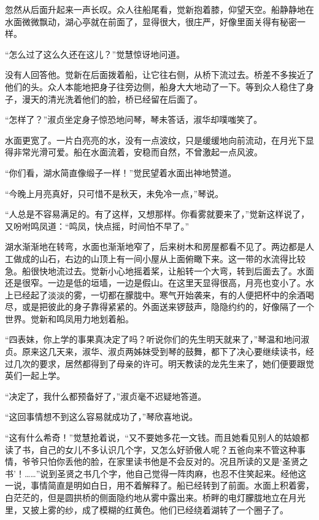 \par 忽然从后面升起来一声长叹。众人往船尾看，觉新抱着膝，仰望天空。船静静地在水面微微飘动，湖心亭就在前面了，显得很大，很庄严，好像里面关得有秘密一样。
\par “怎么过了这么久还在这儿？”觉慧惊讶地问道。
\par 没有人回答他。觉新在后面拨着船，让它往右侧，从桥下流过去。桥差不多挨近了他们的头。众人本能地把身子往旁边侧，船身大大地动了一下。等到众人稳住了身子，漫天的清光洗着他们的脸，桥已经留在后面了。
\par “怎样了？”淑贞坐定身子惊恐地问琴，琴未答话，淑华却噗嗤笑了。
\par 水面更宽了。一片白亮亮的水，没有一点波纹，只是缓缓地向前流动，在月光下显得非常光滑可爱。船在水面流着，安稳而自然，不曾激起一点风波。
\par “你们看，湖水简直像缎子一样！”觉民望着水面出神地赞道。
\par “今晚上月亮真好，只可惜不是秋天，未免冷一点，”琴说。
\par “人总是不容易满足的。有了这样，又想那样。你看雾就要来了，”觉新这样说了，又吩咐鸣凤道：“鸣凤，快点摇，时间怕不早了。”
\par 湖水渐渐地在转弯，水面也渐渐地窄了，后来树木和房屋都看不见了。两边都是人工做成的山石，右边的山顶上有一间小屋从上面俯瞰下来。这一带的水流得比较急。船很快地流过去。觉新小心地摇着桨，让船转一个大弯，转到后面去了。水面还是很窄。一边是低的垣墙，一边是假山。在这里天显得很高，月亮也变小了。水上已经起了淡淡的雾，一切都在朦胧中。寒气开始袭来，有的人便把杯中的余酒喝尽，或是把彼此的身子靠得紧紧的。外面送来锣鼓声，隐隐约约的，好像隔了一个世界。觉新和鸣凤用力地划着船。
\par “四表妹，你上学的事果真决定了吗？听说你们的先生明天就来了，”琴温和地问淑贞。原来这几天来，淑华、淑贞两姊妹受到琴的鼓舞，都下了决心要继续读书，经过几次的要求，居然都得到了母亲的许可。明天教读的龙先生来了，她们便要跟觉英们一起上学。
\par “决定了，我什么都预备好了，”淑贞毫不迟疑地答道。
\par “这回事情想不到这么容易就成功了，”琴欣喜地说。
\par “这有什么希奇！”觉慧抢着说，“又不要她多花一文钱。而且她看见别人的姑娘都读了书，自己的女儿不多认识几个字，又怎么好骄傲人呢？五爸向来不管这种事情，爷爷只怕你丢他的脸，在家里读书他是不会反对的。况且所读的又是‘圣贤之书’！……”说到圣贤之书几个字，他自己觉得一阵肉麻，也忍不住笑起来。经他这一说，事情简直是明如白日，用不着解释了。船已经转到了前面。水面上积着雾，白茫茫的，但是圆拱桥的侧面隐约地从雾中露出来。桥畔的电灯朦胧地立在月光里，又披上雾的纱，成了模糊的红黄色。他们已经绕着湖转了一个圈子了。
